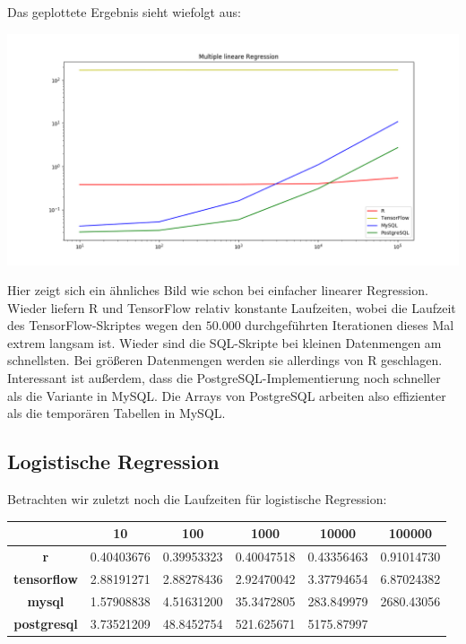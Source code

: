 Das geplottete Ergebnis sieht wiefolgt aus:

\includegraphics[width=\textwidth]{multipleLinearRegressionBenchmark}

Hier zeigt sich ein ähnliches Bild wie schon bei einfacher linearer Regression. Wieder liefern R und TensorFlow relativ konstante Laufzeiten, wobei die Laufzeit des TensorFlow-Skriptes wegen den $50.000$ durchgeführten Iterationen dieses Mal extrem langsam ist. Wieder sind die SQL-Skripte bei kleinen Datenmengen am schnellsten. Bei größeren Datenmengen werden sie allerdings von R geschlagen. Interessant ist außerdem, dass die PostgreSQL-Implementierung noch schneller als die Variante in MySQL. Die Arrays von PostgreSQL arbeiten also effizienter als die temporären Tabellen in MySQL.

\subsection{Logistische Regression}
\label{subsection:4:1:3}

Betrachten wir zuletzt noch die Laufzeiten für logistische Regression:

\begin{center}
  \begin{tabular}{|c|c|c|c|c|c|}\hline
    & \textbf{10} & \textbf{100} & \textbf{1000} & \textbf{10000} & \textbf{100000} \\ \hline
    \textbf{r} & 0.40403676 & 0.39953323 & 0.40047518 & 0.43356463 & 0.91014730 \\ \hline
    \textbf{tensorflow} & 2.88191271 & 2.88278436 & 2.92470042 & 3.37794654 & 6.87024382 \\ \hline
    \textbf{mysql} & 1.57908838 & 4.51631200 & 35.3472805 & 283.849979 & 2680.43056 \\ \hline
    \textbf{postgresql} & 3.73521209 & 48.8452754 & 521.625671 & 5175.87997 &  \\ \hline
  \end{tabular}
\end{center}

